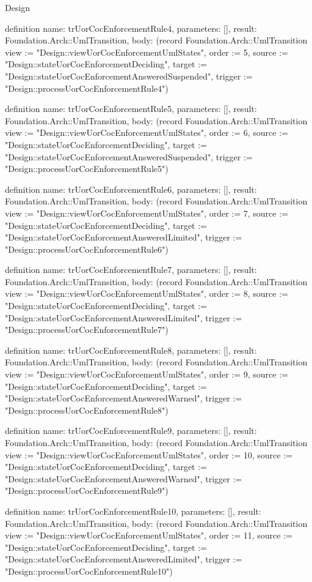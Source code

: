 \begin{lexlean}{Design}
\begin{semanticmodule}
definition{
  name: trUorCocEnforcementRule4,
  parameters: [],
  result: Foundation.Arch::UmlTransition,
  body: (record Foundation.Arch::UmlTransition {view := "Design::viewUorCocEnforcementUmlStates", order := 5, source := "Design::stateUorCocEnforcementDeciding", target := "Design::stateUorCocEnforcementAnsweredSuspended", trigger := "Design::processUorCocEnforcementRule4"})
}

definition{
  name: trUorCocEnforcementRule5,
  parameters: [],
  result: Foundation.Arch::UmlTransition,
  body: (record Foundation.Arch::UmlTransition {view := "Design::viewUorCocEnforcementUmlStates", order := 6, source := "Design::stateUorCocEnforcementDeciding", target := "Design::stateUorCocEnforcementAnsweredSuspended", trigger := "Design::processUorCocEnforcementRule5"})
}

definition{
  name: trUorCocEnforcementRule6,
  parameters: [],
  result: Foundation.Arch::UmlTransition,
  body: (record Foundation.Arch::UmlTransition {view := "Design::viewUorCocEnforcementUmlStates", order := 7, source := "Design::stateUorCocEnforcementDeciding", target := "Design::stateUorCocEnforcementAnsweredLimited", trigger := "Design::processUorCocEnforcementRule6"})
}

definition{
  name: trUorCocEnforcementRule7,
  parameters: [],
  result: Foundation.Arch::UmlTransition,
  body: (record Foundation.Arch::UmlTransition {view := "Design::viewUorCocEnforcementUmlStates", order := 8, source := "Design::stateUorCocEnforcementDeciding", target := "Design::stateUorCocEnforcementAnsweredLimited", trigger := "Design::processUorCocEnforcementRule7"})
}

definition{
  name: trUorCocEnforcementRule8,
  parameters: [],
  result: Foundation.Arch::UmlTransition,
  body: (record Foundation.Arch::UmlTransition {view := "Design::viewUorCocEnforcementUmlStates", order := 9, source := "Design::stateUorCocEnforcementDeciding", target := "Design::stateUorCocEnforcementAnsweredWarned", trigger := "Design::processUorCocEnforcementRule8"})
}

definition{
  name: trUorCocEnforcementRule9,
  parameters: [],
  result: Foundation.Arch::UmlTransition,
  body: (record Foundation.Arch::UmlTransition {view := "Design::viewUorCocEnforcementUmlStates", order := 10, source := "Design::stateUorCocEnforcementDeciding", target := "Design::stateUorCocEnforcementAnsweredWarned", trigger := "Design::processUorCocEnforcementRule9"})
}

definition{
  name: trUorCocEnforcementRule10,
  parameters: [],
  result: Foundation.Arch::UmlTransition,
  body: (record Foundation.Arch::UmlTransition {view := "Design::viewUorCocEnforcementUmlStates", order := 11, source := "Design::stateUorCocEnforcementDeciding", target := "Design::stateUorCocEnforcementAnsweredLimited", trigger := "Design::processUorCocEnforcementRule10"})
}


\end{semanticmodule}
\end{lexlean}
